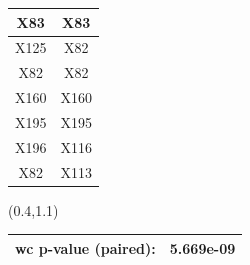 \documentclass{beamer}
\newcommand{\boz}{\cellcolor{pathwaynode}}
\begin{document}
\begin{frame}[plain]
\begin{textblock*}{\paperwidth}
\begin{tabular}{| c c |}
X83   &  X83  \\ \hline
\boz X125   &  \boz X82  \\ \hline
\boz X82   &  \boz X82  \\ \hline
X160   &  X160  \\ \hline
X195   &  X195  \\ \hline
\boz X196   &  \boz X116  \\ \hline
\boz X82   &  \boz X113  \\ \hline
    \end{tabular}
    \hspace{.5em}
  \end{textblock*}
  \begin{textblock*}{\paperwidth}(0.4\textwidth,1.1\textheight)
    \raggedright 
    \tiny
    \begin{tabular}{| c c |}
      \hline
      wc p-value (paired): & 5.669e-09 \\ \hline
    \end{tabular}
    \hspace{.5em}
  \end{textblock*}
\end{frame}
\end{document}
